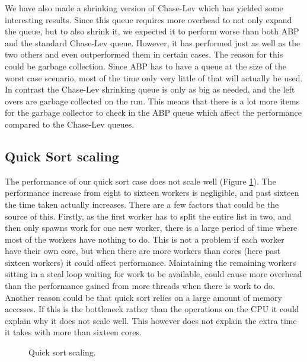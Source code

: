 We have also made a shrinking version of Chase-Lev which has yielded some interesting results. Since this queue requires more overhead to not only expand the queue, but to also shrink it, we expected it to perform worse than both ABP and the standard Chase-Lev queue. However, it has performed just as well as the two others and even outperformed them in certain cases. The reason for this could be garbage collection. Since ABP has to have a queue at the size of the worst case scenario, most of the time only very little of that will actually be used. In contrast the Chase-Lev shrinking queue is only as big as needed, and the left overs are garbage collected on the run. This means that there is a lot more items for the garbage collector to check in the ABP queue which affect the performance compared to the Chase-Lev queues.

\subsection{Quick Sort scaling}
The performance of our quick sort case does not scale well (Figure \ref{fig:qsscaling}). The performance increase from eight to sixteen workers is negligible, and past sixteen the time taken actually increases. There are a few factors that could be the source of this. Firstly, as the first worker has to split the entire list in two, and then only spawns work for one new worker, there is a large period of time where most of the workers have nothing to do. This is not a problem if each worker have their own core, but when there are more workers than cores (here past sixteen workers) it could affect performance. Maintaining the remaining workers sitting in a steal loop waiting for work to be available, could cause more overhead than the performance gained from more threads when there is work to do. Another reason could be that quick sort relies on a large amount of memory accesses. If this is the bottleneck rather than the operations on the CPU it could explain why it does not scale well. This however does not explain the extra time it takes with more than sixteen cores.

\begin{figure}
\caption{Quick sort scaling.}
\label{fig:qsscaling}
\end{figure}

